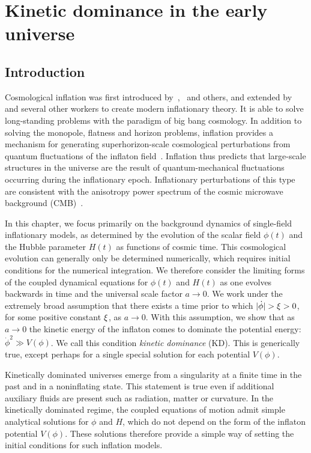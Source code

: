 \chapter{Kinetic dominance in the early universe}
\label{chp:kd}

\section{Introduction}

Cosmological inflation was first introduced by~\cite{starobinskii_spectrum_1979},~\cite{guth_inflationary_1981} and others, and extended by~\cite{linde_1982} and several other workers to create modern inflationary theory. It is able to solve long-standing problems with the paradigm of big bang cosmology. In addition to solving the monopole, flatness and horizon problems, inflation provides a mechanism for generating superhorizon-scale cosmological perturbations from quantum fluctuations of the inflaton field~\citep[see, for example][]{mukhanov_theory_1992}. Inflation thus predicts that large-scale structures in the universe are the result of quantum-mechanical fluctuations occurring during the inflationary epoch. Inflationary perturbations of this type are consistent with the anisotropy power spectrum of the cosmic microwave background (CMB)~\citep{hinshaw_nine-year_2012,planck_collaboration_planck_2013}.

In this chapter, we focus primarily on the background dynamics of single-field inflationary models, as determined by the evolution of the scalar field \(\phi(t)\) and the Hubble parameter \(H(t)\) as functions of cosmic time.  This cosmological evolution can generally only be determined numerically, which requires initial conditions for the numerical integration.  We therefore consider the limiting forms of the coupled dynamical equations for \(\phi(t)\) and \(H(t)\) as one evolves backwards in time and the universal scale factor \(a\to 0\). We work under the extremely broad assumption that there exists a time prior to which \(|\dot{\phi}| > \xi > 0\), for some positive constant \(\xi\), as \(a \to 0\).  With this assumption, we show that as \(a\to 0\) the kinetic energy of the inflaton comes to dominate the potential energy: \(\dot{\phi}^2\gg V(\phi)\). We call this condition {\em kinetic dominance\/} (KD). This is generically true, except perhaps for a single special solution for each potential \(V(\phi)\).

Kinetically dominated universes emerge from a singularity at a finite time in the past and in a noninflating state. This statement is true even if additional auxiliary fluids are present such as radiation, matter or curvature.  In the kinetically dominated regime, the coupled equations of motion admit simple analytical solutions for \(\phi\) and \(H\), which do not depend on the form of the inflaton potential \(V(\phi)\).  These solutions therefore provide a simple way of setting the initial conditions for such inflation models.

